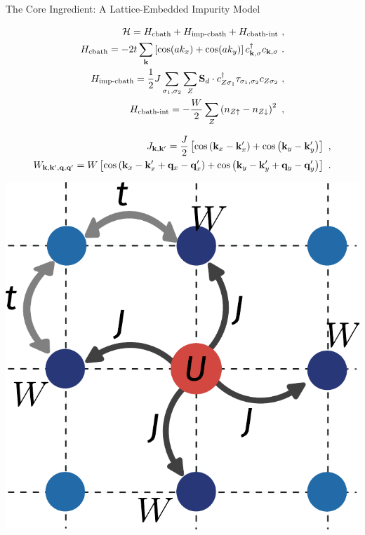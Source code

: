 \documentclass[10pt,aspectratio=169]{beamer}
\begin{document}
\begin{frame}{The Core Ingredient: A Lattice-Embedded Impurity Model}
\begin{minipage}{0.75\textwidth}
\begin{equation}\begin{aligned}
	\mathcal{H} = H_\text{cbath} + H_\text{imp-cbath} + H_\text{cbath-int}~,\\
	H_\text{cbath} = -2t\sum_{{\bf k}}\left[\cos(ak_x) + \cos(ak_y)\right] c^\dagger_{{\bf k},\sigma}c_{{\bf k},\sigma}~.\\
	H_\text{imp-cbath} =\frac{1}{2} J\sum_{\sigma_1,\sigma_2}\sum_{Z} {\bf S}_d\cdot c^\dagger_{Z\sigma_1}{ \tau}_{\sigma_1,\sigma_2} c_{Z\sigma_2}~,\\
	H_\text{cbath-int} = -\frac{W}{2}\sum_{Z} \left(n_{Z\uparrow} - n_{Z\downarrow}\right)^2 ~,
\end{aligned}\end{equation}

\begin{equation}\begin{aligned}
	J_{{\bf k}, {\bf k}^\prime} = \frac{J}{2}\left[\cos\left({\bf k}_x - {\bf k}^\prime_x\right) + \cos\left({\bf k}_y - {\bf k}^\prime_y\right)\right] ~,\\
	W_{{\bf k}, {\bf k}^\prime,{\bf q}, {\bf q}^\prime} = W\left[\cos\left({\bf k}_x - {\bf k}^\prime_x + {\bf q}_x - {\bf q}^\prime_x\right) + \cos\left({\bf k}_y - {\bf k}^\prime_y + {\bf q}_y - {\bf q}^\prime_y\right)\right] ~.
\end{aligned}\end{equation}
\end{minipage}
\begin{minipage}{0.2\textwidth}
	\includegraphics[width=\textwidth]{pWaveEsiam.pdf}
\end{minipage}
\end{frame}
\end{document}
